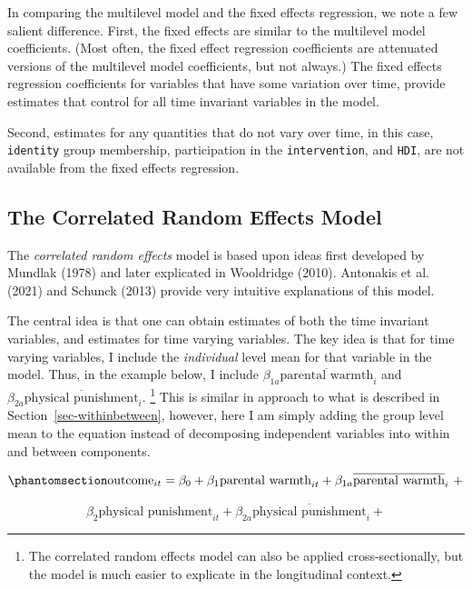 \documentclass[
  letterpaper,
  DIV=11,
  numbers=noendperiod]{scrreprt}
\begin{document}
In comparing the multilevel model and the fixed effects regression, we
note a few salient difference. First, the fixed effects are similar to
the multilevel model coefficients. (Most often, the fixed effect
regression coefficients are attenuated versions of the multilevel model
coefficients, but not always.) The fixed effects regression coefficients
for variables that have some variation over time, provide estimates that
control for all time invariant variables in the model.

Second, estimates for any quantities that do not vary over time, in this
case, \texttt{identity} group membership, participation in the
\texttt{intervention}, and \texttt{HDI}, are not available from the
fixed effects regression.

\subsection{The Correlated Random Effects
Model}\label{the-correlated-random-effects-model}

The \emph{correlated random effects} model is based upon ideas first
developed by Mundlak (1978) and later explicated in Wooldridge (2010).
Antonakis et al. (2021) and Schunck (2013) provide very intuitive
explanations of this model. 

The central idea is that one can obtain estimates of both the time
invariant variables, and estimates for time varying variables. The key
idea is that for time varying variables, I include the \emph{individual}
level mean for that variable in the model. Thus, in the example below, I
include \(\beta_{1a}\overline{\text{parental warmth}}_{i}\) and
\(\beta_{2a}\overline{\text{physical punishment}}_{i}\). \footnote{The
  correlated random effects model can also be applied cross-sectionally,
  but the model is much easier to explicate in the longitudinal context.}
This is similar in approach to what is described in
Section~\ref{sec-withinbetween}, however, here I am simply adding the
group level mean to the equation instead of decomposing independent
variables into within and between components.

\begin{equation}\phantomsection\label{eq-CRE}{\text{outcome}_{it} = \beta_0 + \beta_1 \text{parental warmth}_{it} + \beta_{1a}\overline{\text{parental warmth}}_{i} \ + }\end{equation}

\[\beta_2 \text{physical punishment}_{it} + \beta_{2a}\overline{\text{physical punishment}}_{i} + \]
\end{document}
